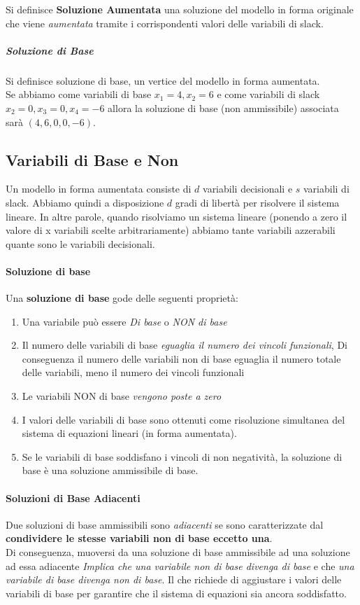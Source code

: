\documentclass[12pt, a4paper, openany]{book}
\begin{document}
Si definisce \textbf{Soluzione Aumentata} una soluzione del modello in forma originale che viene \emph{aumentata} tramite i
corrispondenti valori delle variabili di slack.
\subparagraph*{Soluzione di Base} 
Si definisce soluzione di base, un vertice del modello in forma aumentata.
\\Se abbiamo come variabili di base $x_1=4,x_2=6$ e come variabili di slack $x_2=0,x_3=0,x_4=-6$ allora la soluzione
di base (non ammissibile) associata sarà $(4,6,0,0,-6)$.
\subsection*{Variabili di Base e Non}
Un modello in forma aumentata consiste di $d$ variabili decisionali e $s$ variabili di slack.
Abbiamo quindi a disposizione $d$ gradi di libertà per risolvere il sistema lineare.
In altre parole, quando risolviamo un sistema lineare (ponendo a zero il valore di x variabili scelte arbitrariamente)
abbiamo tante variabili azzerabili quante sono le variabili decisionali.
\paragraph*{Soluzione di base}
Una \textbf{soluzione di base} gode delle seguenti proprietà:
\begin{enumerate} %
    \item Una variabile può essere \emph{Di base} o \emph{NON di base}
    \item Il numero delle variabili di base \emph{eguaglia il numero dei vincoli funzionali},
    Di conseguenza il numero delle variabili non di base eguaglia il numero totale delle variabili, meno il numero dei vincoli funzionali
    \item Le variabili NON di base \emph{vengono poste a zero}
    \item I valori delle variabili di base sono ottenuti come risoluzione simultanea del sistema di equazioni lineari (in forma aumentata).
    \item Se le variabili di base soddisfano i vincoli di non negatività, la soluzione di base è una soluzione ammissibile di base.
\end{enumerate}
\paragraph{Soluzioni di Base Adiacenti}
Due soluzioni di base ammissibili sono \emph{adiacenti} se sono caratterizzate dal \textbf{condividere le stesse variabili non di base eccetto una}.
\\Di conseguenza, muoversi da una soluzione di base ammissibile ad una soluzione ad essa adiacente 
\emph{Implica che una variabile non di base divenga di base} e che \emph{una variabile di base divenga non di base}.
Il che richiede di aggiustare i valori delle variabili di base per garantire che il sistema di equazioni sia ancora soddisfatto.
\end{document}
